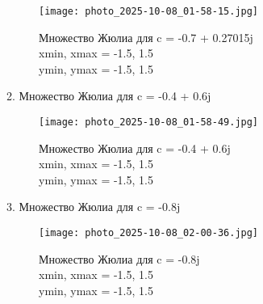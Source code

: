 \documentclass[a4paper,12pt]{article}
\begin{document}
\begin{figure}[h!]
    \centering
    \texttt{[image: photo\_2025-10-08\_01-58-15.jpg]}
    \caption{Множество Жюлиа для c = -0.7 + 0.27015j \\ xmin, xmax = -1.5, 1.5 \\ ymin, ymax = -1.5, 1.5}
    \label{fig:julia1}
\end{figure}

\newpage

2. Множество Жюлиа для c = -0.4 + 0.6j

\begin{figure}[h!]
    \centering
    \texttt{[image: photo\_2025-10-08\_01-58-49.jpg]}
    \caption{Множество Жюлиа для c = -0.4 + 0.6j \\ xmin, xmax = -1.5, 1.5 \\ ymin, ymax = -1.5, 1.5}
    \label{fig:julia2}
\end{figure}

\newpage

3. Множество Жюлиа для c = -0.8j

\begin{figure}[h!]
    \centering
    \texttt{[image: photo\_2025-10-08\_02-00-36.jpg]}
    \caption{Множество Жюлиа для c = -0.8j \\ xmin, xmax = -1.5, 1.5 \\ ymin, ymax = -1.5, 1.5}
    \label{fig:julia3}
\end{figure}
\end{document}
